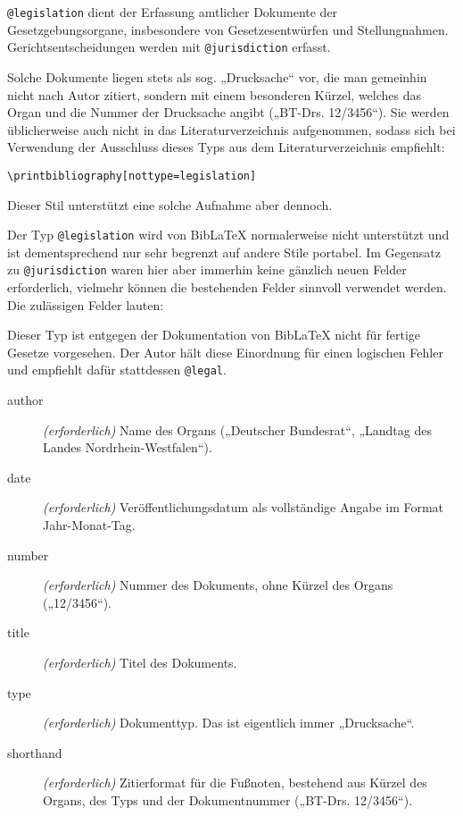 \documentclass[11pt,a4paper,DIV=calc]{scrartcl}
\newcommand\software[1]{\textsf{#1}}
\newcommand\Biblatex{\software{Bib\LaTeX{}}\xspace}
\begin{document}
\verb+@legislation+ dient der Erfassung amtlicher Dokumente der
Gesetzgebungsorgane, insbesondere von Gesetzesentwürfen und
Stellungnahmen. Gerichtsentscheidungen werden mit \verb+@jurisdiction+
erfasst.

Solche Dokumente liegen stets als sog. „Drucksache“ vor, die man
gemeinhin nicht nach Autor zitiert, sondern mit einem besonderen
Kürzel, welches das Organ und die Nummer der Drucksache angibt
(„BT-Drs. 12/3456“). Sie werden üblicherweise auch nicht in das
Literaturverzeichnis aufgenommen, sodass sich bei Verwendung der
Ausschluss dieses Typs aus dem Literaturverzeichnis empfiehlt:

\begin{verbatim}
\printbibliography[nottype=legislation]
\end{verbatim}

Dieser Stil unterstützt eine solche Aufnahme aber dennoch.

Der Typ \verb+@legislation+ wird von \Biblatex normalerweise nicht
unterstützt und ist dementsprechend nur sehr begrenzt auf andere Stile
portabel. Im Gegensatz zu \verb+@jurisdiction+ waren hier aber
immerhin keine gänzlich neuen Felder erforderlich, vielmehr können die
bestehenden Felder sinnvoll verwendet werden. Die zulässigen Felder
lauten:

Dieser Typ ist entgegen der Dokumentation von \Biblatex nicht für
fertige Gesetze vorgesehen. Der Autor hält diese Einordnung für einen
logischen Fehler und empfiehlt dafür stattdessen \verb+@legal+.

\begin{description}
\item[author] \emph{(erforderlich)} Name des Organs („Deutscher
  Bundesrat“, „Landtag des Landes Nordrhein-Westfalen“).
\item[date] \emph{(erforderlich)} Veröffentlichungsdatum als
  vollständige Angabe im Format Jahr-Monat-Tag.
\item[number] \emph{(erforderlich)} Nummer des Dokuments, ohne Kürzel
  des Organs („12/3456“).
\item[title] \emph{(erforderlich)} Titel des Dokuments.
\item[type] \emph{(erforderlich)} Dokumenttyp. Das ist eigentlich
  immer „Drucksache“.
\item[shorthand] \emph{(erforderlich)} Zitierformat für die Fußnoten,
  bestehend aus Kürzel des Organs, des Typs und der Dokumentnummer
  („BT-Drs. 12/3456“).
\end{description}
\end{document}
